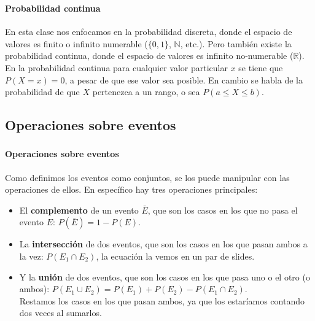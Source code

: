\documentclass[../main.tex]{subfiles}
\begin{document}
\begin{frame}
  \frametitle{\SECTIONA}
  \framesubtitle{Probabilidad continua}
  
  En esta clase nos enfocamos en la probabilidad discreta, donde el espacio de valores es finito o infinito numerable (\(\{0, 1\}\), \(\mathbb{N}\), etc.). Pero también existe la probabilidad continua, donde el espacio de valores es infinito no-numerable (\(\mathbb{R}\)). \pause \\
  En la probabilidad continua para cualquier valor particular \(x\) se tiene que \(P(X = x) = 0\), a pesar de que ese valor sea posible. \pause En cambio se habla de la probabilidad de que \(X\) pertenezca a un rango, o sea \(P(a \leq X \leq b)\).
\end{frame}

\subsection{Operaciones sobre eventos}

\begin{frame}
  \frametitle{\SECTIONA}
  \framesubtitle{Operaciones sobre eventos}

  Como definimos los eventos como conjuntos, se los puede manipular con las operaciones de ellos. En específico hay tres operaciones principales:
  \begin{itemize}
    \item<2-> El \textbf{complemento} de un evento \(\bar{E}\), que son los casos en los que no pasa el evento \(E\): \(P(\bar{E}) = 1 - P(E)\).
    \item<3-> La \textbf{intersección} de dos eventos, que son los casos en los que pasan ambos a la vez: \(P(E_{1} \cap E_{2})\), la ecuación la vemos en un par de slides.
    \item<4-> Y la \textbf{unión} de dos eventos, que son los casos en los que pasa uno o el otro (o ambos): \(P(E_{1} \cup E_{2}) = P(E_{1}) + P(E_{2}) - P(E_{1} \cap E_{2})\). \pause \\
      Restamos los casos en los que pasan ambos, ya que los estaríamos contando dos veces al sumarlos.
  \end{itemize}
\end{frame}
\end{document}
